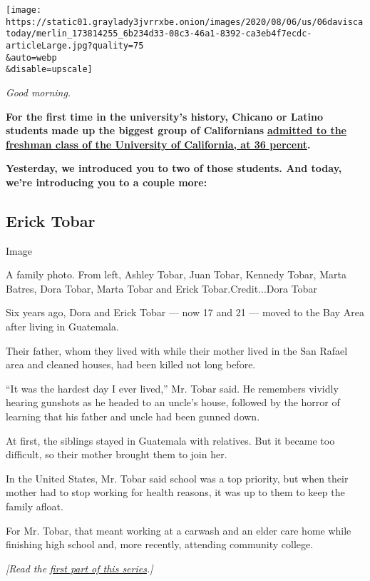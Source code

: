 \texttt{[image: https://static01.graylady3jvrrxbe.onion/images/2020/08/06/us/06daviscatoday/merlin\_173814255\_6b234d33-08c3-46a1-8392-ca3eb4f7ecdc-articleLarge.jpg?quality=75\\\&auto=webp\\\&disable=upscale]}

\emph{Good morning.}

\textbf{For the first time in the university's history, Chicano or
Latino students made up the biggest group of Californians}
\textbf{\href{https://www.ucop.edu/institutional-research-academic-planning/_files/factsheets/2020/fall-2020-admission-table-2-1.pdf}{admitted
to the freshman class of the University of California, at 36 percent}.}

\textbf{Yesterday, we introduced you to two of those students. And
today, we're introducing you to a couple more:}

\hypertarget{erick-tobar}{%
\subsection{Erick Tobar}\label{erick-tobar}}

Image

A family photo. From left, Ashley Tobar, Juan Tobar, Kennedy Tobar,
Marta Batres, Dora Tobar, Marta Tobar and Erick Tobar.Credit...Dora
Tobar

Six years ago, Dora and Erick Tobar --- now 17 and 21 --- moved to the
Bay Area after living in Guatemala.

Their father, whom they lived with while their mother lived in the San
Rafael area and cleaned houses, had been killed not long before.

``It was the hardest day I ever lived,'' Mr. Tobar said. He remembers
vividly hearing gunshots as he headed to an uncle's house, followed by
the horror of learning that his father and uncle had been gunned down.

At first, the siblings stayed in Guatemala with relatives. But it became
too difficult, so their mother brought them to join her.

In the United States, Mr. Tobar said school was a top priority, but when
their mother had to stop working for health reasons, it was up to them
to keep the family afloat.

For Mr. Tobar, that meant working at a carwash and an elder care home
while finishing high school and, more recently, attending community
college.

\emph{{[}Read the}
\href{https://www.nytimes3xbfgragh.onion/2020/08/05/us/university-california-latino-students.html?smid=tw-share}{\emph{first
part of this series}}\emph{.{]}}

